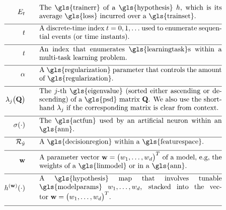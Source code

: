 \begin{align}
	\trainerror \quad\quad &\parbox{.75\textwidth}{The \gls{trainerr} of a \gls{hypothesis} $\hypothesis$, which is its 
		average \gls{loss} incurred over a \gls{trainset}. }\nonumber \\[2mm] \hline \nonumber\\[-5mm]
	\timeidx \quad\quad &\parbox{.75\textwidth}{A discrete-time index $\timeidx=0,1,\ldots$ used to 
		enumerate sequential events (or time instants). }\nonumber \\[2mm] \hline \nonumber\\[-5mm]
	\taskidx \quad\quad &\parbox{.75\textwidth}{An index that enumerates
		\gls{learningtask}s within a multi-task learning problem.}\nonumber \\[2mm] \hline \nonumber\\[-5mm]
	\regparam \quad\quad &\parbox{.75\textwidth}{A \gls{regularization} parameter that controls 
		the amount of \gls{regularization}. } \nonumber \\[2mm] \hline \nonumber\\[-5mm]
	\eigval{\featureidx}\big( \mathbf{Q} \big) \quad\quad &\parbox{.75\textwidth}{The $\featureidx$-th 
		\gls{eigenvalue} (sorted either ascending or descending) of a \gls{psd} matrix $\mathbf{Q}$. We also 
		use the shorthand $\eigval{\featureidx}$ if the corresponding matrix is clear from context. }\nonumber \\[2mm] \hline \nonumber\\[-5mm]
	\actfun(\cdot) \quad\quad &\parbox{.75\textwidth}{The \gls{actfun} used by an artificial neuron within an \gls{ann}.}\nonumber \\[2mm] \hline \nonumber\\[-5mm]
	\decreg{\hat{\truelabel}} \quad\quad &\parbox{.75\textwidth}{A \gls{decisionregion} within a \gls{featurespace}.  }\nonumber \\[2mm] \hline \nonumber\\[-5mm]  
	\weights  \quad\quad & \parbox{.75\textwidth}{A parameter vector $\weights = \big(\weight_{1},\ldots,\weight_{\featuredim}\big)^{T}$ 
		of a model, e.g, the weights of a \gls{linmodel} or in a \gls{ann}.}     \nonumber \\[2mm] \hline \nonumber\\[-5mm]
	\hypothesis^{(\weights)}(\cdot)  \quad\quad &\parbox{.75\textwidth}{A \gls{hypothesis} map that involves tunable \gls{modelparams} $\weight_{1},\ldots,\weight_{\featuredim}$, stacked into the vector $\weights=\big(\weight_{1},\ldots,\weight_{\featuredim} \big)^{T}$.} \nonumber \\[2mm] \hline \nonumber\\[-5mm]

\end{align}
